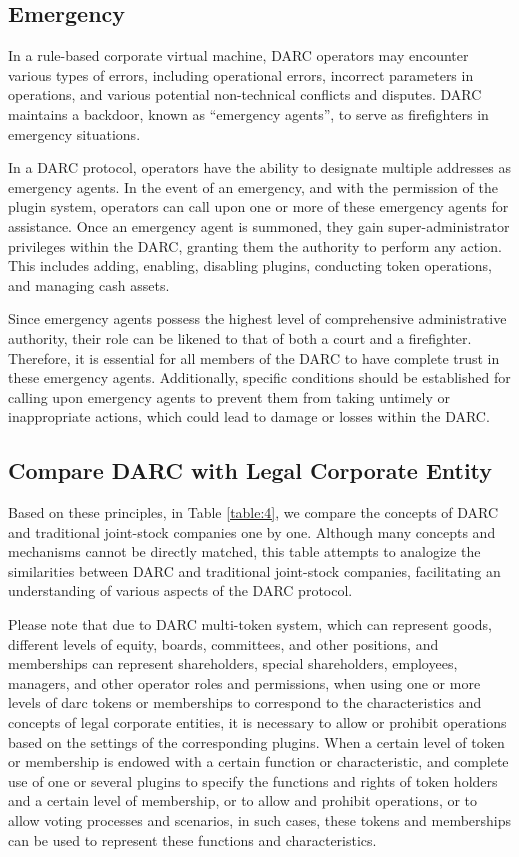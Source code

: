 \documentclass[main.tex]{subfiles}
\begin{document}
\subsection{Emergency}

In a rule-based corporate virtual machine, DARC operators may encounter various types of errors, including operational errors, incorrect parameters in operations, and various potential non-technical conflicts and disputes. DARC maintains a backdoor, known as ``emergency agents'', to serve as firefighters in emergency situations.

In a DARC protocol, operators have the ability to designate multiple addresses as emergency agents. In the event of an emergency, and with the permission of the plugin system, operators can call upon one or more of these emergency agents for assistance. Once an emergency agent is summoned, they gain super-administrator privileges within the DARC, granting them the authority to perform any action. This includes adding, enabling, disabling plugins, conducting token operations, and managing cash assets.

Since emergency agents possess the highest level of comprehensive administrative authority, their role can be likened to that of both a court and a firefighter. Therefore, it is essential for all members of the DARC to have complete trust in these emergency agents. Additionally, specific conditions should be established for calling upon emergency agents to prevent them from taking untimely or inappropriate actions, which could lead to damage or losses within the DARC.

\subsection{Compare DARC with Legal Corporate Entity}

Based on these principles, in Table \ref{table:4}, we compare the concepts of DARC and traditional joint-stock companies one by one. Although many concepts and mechanisms cannot be directly matched, this table attempts to analogize the similarities between DARC and traditional joint-stock companies, facilitating an understanding of various aspects of the DARC protocol.

Please note that due to DARC multi-token system, which can represent goods, different levels of equity, boards, committees, and other positions, and memberships can represent shareholders, special shareholders, employees, managers, and other operator roles and permissions, when using one or more levels of darc tokens or memberships to correspond to the characteristics and concepts of legal corporate entities, it is necessary to allow or prohibit operations based on the settings of the corresponding plugins. When a certain level of token or membership is endowed with a certain function or characteristic, and complete use of one or several plugins to specify the functions and rights of token holders and a certain level of membership, or to allow and prohibit operations, or to allow voting processes and scenarios, in such cases, these tokens and memberships can be used to represent these functions and characteristics.
\end{document}
